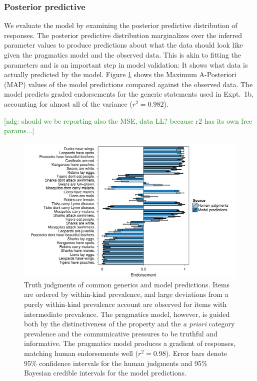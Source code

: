 \documentclass[10pt,letterpaper]{article}
\newcommand{\ndg}[1]{\textcolor{Green}{[ndg: #1]}}
\begin{document}
\subsubsection{Posterior predictive}

We evaluate the model by examining the posterior predictive distribution of responses. 
The posterior predictive distribution marginalizes over the inferred parameter values to produce predictions about what the data should look like given the pragmatics model and the observed data. 
This is akin to fitting the parameters and is an important step in model validation: It shows what data is actually predicted by the model. 
Figure \ref{fig:tj1b} shows the Maximum A-Posteriori (MAP) values of the model predictions compared against the observed data. 
The model predicts graded endorsements for the generic statements used in Expt.~1b, accounting for almost all of the variance ($r^2 = 0.982$). 

\ndg{should we be reporting also the MSE, data LL? because r2 has its own free params...}

\begin{figure}
\centering
    \includegraphics[width=\columnwidth]{tj_n100-postPred-byItem.pdf}
    \caption{Truth judgments of common generics and model predictions. 
Items are ordered by within-kind prevalence, and large deviations from a purely within-kind prevalence account are observed for items with intermediate prevalence. 
The pragmatics model, however, is guided both by the distinctiveness of the property and the \emph{a priori} category prevalence and the communicative pressures to be truthful and informative.
The pragmatics model produces a gradient of responses, matching human endorsements well ($r^2 = 0.98$).
Error bars denote 95\% confidence intervals for the human judgments and 95\% Bayesian credible intervals for the model predictions.}
  \label{fig:tj1b}
\end{figure}
\end{document}
